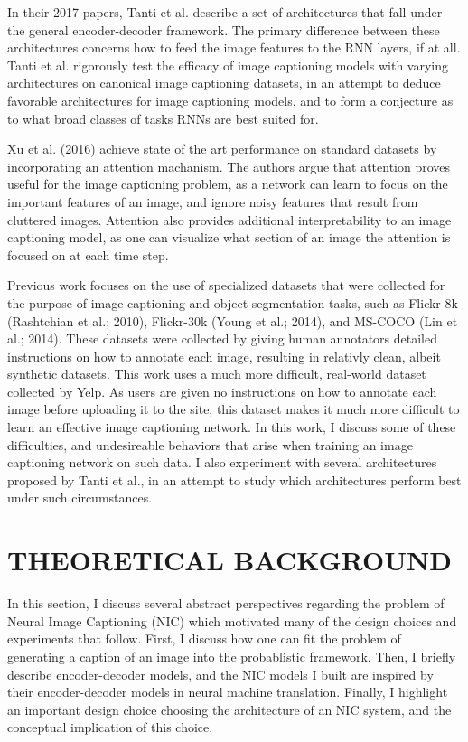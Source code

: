 \documentclass[letterpaper, 10 pt, conference]{ieeeconf}
\begin{document}
In their 2017 papers, Tanti et al. describe a set of architectures that fall under the general encoder-decoder framework. The primary difference between these architectures concerns how to feed the image features to the RNN layers, if at all. Tanti et al. rigorously test the efficacy of image captioning models with varying architectures on canonical image captioning datasets, in an attempt to deduce favorable architectures for image captioning models, and to form a conjecture as to what broad classes of tasks RNNs are best suited for.

Xu et al. (2016) achieve state of the art performance on standard datasets by incorporating an attention machanism. The authors argue that attention proves useful for the image captioning problem, as a network can learn to focus on the important features of an image, and ignore noisy features that result from cluttered images. Attention also provides additional interpretability to an image captioning model, as one can visualize what section of an image the attention is focused on at each time step. 

Previous work focuses on the use of specialized datasets that were collected for the purpose of image captioning and object segmentation tasks, such as Flickr-8k (Rashtchian et al.; 2010), Flickr-30k (Young et al.; 2014), and MS-COCO (Lin et al.; 2014). These datasets were collected by giving human annotators detailed instructions on how to annotate each image, resulting in relativly clean, albeit synthetic datasets. This work uses a much more difficult, real-world dataset collected by Yelp. As users are given no instructions on how to annotate each image before uploading it to the site, this dataset makes it much more difficult to learn an effective image captioning network. In this work, I discuss some of these difficulties, and undesireable behaviors that arise when training an image captioning network on such data. I also experiment with several architectures proposed by Tanti et al., in an attempt to study which architectures perform best under such circumstances.


\section{THEORETICAL BACKGROUND}

In this section, I discuss several abstract perspectives regarding the problem of Neural Image Captioning (NIC) which motivated many of the design choices and experiments that follow. First, I discuss how one can fit the problem of generating a caption of an image into the probablistic framework. Then, I briefly describe encoder-decoder models, and the NIC models I built are inspired by their encoder-decoder models in neural machine translation. Finally, I highlight an important design choice choosing the architecture of an NIC system, and the conceptual implication of this choice. 
\end{document}
